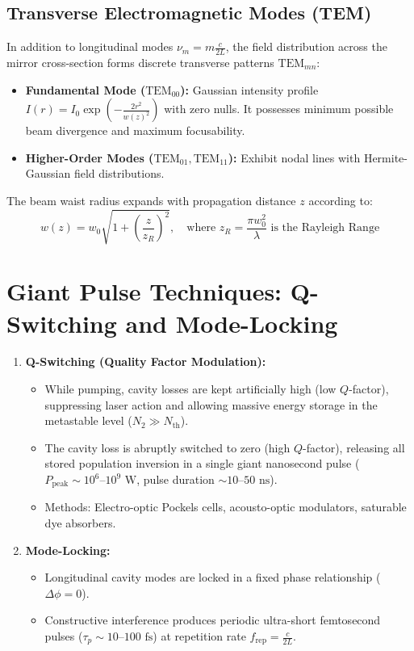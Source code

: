 \subsection{Transverse Electromagnetic Modes (TEM)}
In addition to longitudinal modes $\nu_m = m \frac{c}{2L}$, the field distribution across the mirror cross-section forms discrete transverse patterns $\text{TEM}_{mn}$:
\begin{itemize}[itemsep=2pt]
    \item \textbf{Fundamental Mode ($\text{TEM}_{00}$):} Gaussian intensity profile $I(r) = I_0 \exp\left(-\frac{2r^2}{w(z)^2}\right)$ with zero nulls. It possesses minimum possible beam divergence and maximum focusability.
    \item \textbf{Higher-Order Modes ($\text{TEM}_{01}, \text{TEM}_{11}$):} Exhibit nodal lines with Hermite-Gaussian field distributions.
\end{itemize}
The beam waist radius expands with propagation distance $z$ according to:
\begin{equation}
w(z) = w_0 \sqrt{1 + \left(\frac{z}{z_R}\right)^2}, \quad \text{where } z_R = \frac{\pi w_0^2}{\lambda} \text{ is the Rayleigh Range}
\end{equation}

\section{Giant Pulse Techniques: Q-Switching and Mode-Locking}
\begin{enumerate}[leftmargin=*,itemsep=3pt]
    \item \textbf{Q-Switching (Quality Factor Modulation):}
    \begin{itemize}
        \item While pumping, cavity losses are kept artificially high (low $Q$-factor), suppressing laser action and allowing massive energy storage in the metastable level ($N_2 \gg N_{\text{th}}$).
        \item The cavity loss is abruptly switched to zero (high $Q$-factor), releasing all stored population inversion in a single giant nanosecond pulse ($P_{\text{peak}} \sim 10^6\text{--}10^9\text{ W}$, pulse duration $\sim 10\text{--}50\text{ ns}$).
        \item Methods: Electro-optic Pockels cells, acousto-optic modulators, saturable dye absorbers.
    \end{itemize}
    \item \textbf{Mode-Locking:}
    \begin{itemize}
        \item Longitudinal cavity modes are locked in a fixed phase relationship ($\Delta\phi = 0$).
        \item Constructive interference produces periodic ultra-short femtosecond pulses ($\tau_p \sim 10\text{--}100\text{ fs}$) at repetition rate $f_{\text{rep}} = \frac{c}{2L}$.
    \end{itemize}
\end{enumerate}

